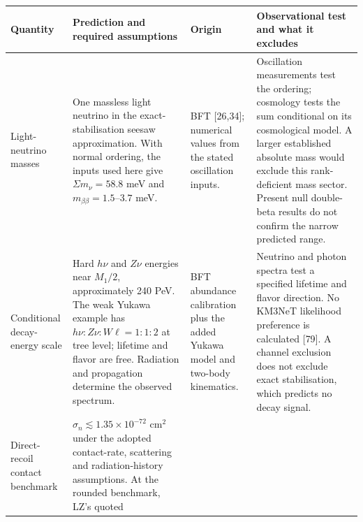 \documentclass[
]{article}
\newcounter{none} %
\begin{document}
{\def\LTcaptype{none} %
\begin{longtable}[]{@{}
  >{\raggedright\arraybackslash}p{}
  >{\raggedright\arraybackslash}p{}
  >{\raggedright\arraybackslash}p{}
  >{\raggedright\arraybackslash}p{}@{}}
\toprule\noalign{}
\begin{minipage}[b]{\linewidth}\raggedright
Quantity
\end{minipage} & \begin{minipage}[b]{\linewidth}\raggedright
Prediction and required assumptions
\end{minipage} & \begin{minipage}[b]{\linewidth}\raggedright
Origin
\end{minipage} & \begin{minipage}[b]{\linewidth}\raggedright
Observational test and what it excludes
\end{minipage} \\
\midrule\noalign{}
\endhead
\bottomrule\noalign{}
\endlastfoot
Light-neutrino masses & One massless light neutrino in the
exact-stabilisation seesaw approximation. With normal ordering, the
inputs used here give \(\Sigma m_\nu=58.8\) meV and
\(m_{\beta\beta}=1.5\)--\(3.7\) meV. & BFT {[}26,34{]}; numerical values
from the stated oscillation inputs. & Oscillation measurements test the
ordering; cosmology tests the sum conditional on its cosmological model.
A larger established absolute mass would exclude this rank-deficient
mass sector. Present null double-beta results do not confirm the narrow
predicted range. \\
Conditional decay-energy scale & Hard \(h\nu\) and \(Z\nu\) energies
near \(M_1/2\), approximately 240 PeV. The weak Yukawa example has
\(h\nu:Z\nu:W\ell=1:1:2\) at tree level; lifetime and flavor are free.
Radiation and propagation determine the observed spectrum. & BFT
abundance calibration plus the added Yukawa model and two-body
kinematics. & Neutrino and photon spectra test a specified lifetime and
flavor direction. No KM3NeT likelihood preference is calculated
{[}79{]}. A channel exclusion does not exclude exact stabilisation,
which predicts no decay signal. \\
Direct-recoil contact benchmark & \(\sigma_n\lesssim1.35\times10^{-72}\)
cm\(^2\) under the adopted contact-rate, scattering and
radiation-history assumptions. At the rounded benchmark, LZ's quoted

\end{longtable}}
\end{document}
